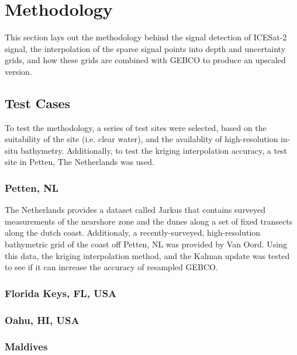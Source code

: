 \chapter{Methodology}
This section lays out the methodology behind the signal detection of ICESat-2 signal, the interpolation of the sparse signal points into depth and uncertainty grids, and how these grids are combined with GEBCO to produce an upscaled version.
\section{Test Cases}
To test the methodology, a series of test sites were selected, based on the suitability of the site (i.e. clear water), and the availablity of high-resolution in-situ bathymetry. Additionally, to test the kriging interpolation accuracy, a test site in Petten, The Netherlands was used.
\subsection{Petten, NL}
The Netherlands provides a dataset called Jarkus that contains surveyed measurements of the nearshore zone and the dunes along a set of fixed transects along the dutch coast. Additionaly, a recently-surveyed, high-resolution bathymetric grid of the coast off Petten, NL was provided by Van Oord. Using this data, the kriging interpolation method, and the Kalman update was tested to see if it can increase the accuracy of resampled GEBCO. 
\subsection{Florida Keys, FL, USA}
\subsection{Oahu, HI, USA}
\subsection{Maldives}


